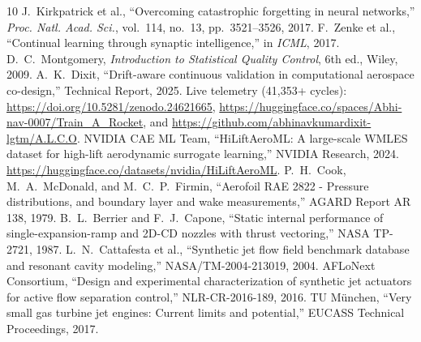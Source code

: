 \documentclass[journal,10pt,twocolumn]{IEEEtran}
\begin{document}
\begin{thebibliography}{10}
 J.~Kirkpatrick et al., ``Overcoming catastrophic forgetting in neural networks,'' \emph{Proc. Natl. Acad. Sci.}, vol.~114, no.~13, pp.~3521--3526, 2017.
 F.~Zenke et al., ``Continual learning through synaptic intelligence,'' in \emph{ICML}, 2017.
 D.~C.~Montgomery, \emph{Introduction to Statistical Quality Control}, 6th ed., Wiley, 2009.
 A.~K.~Dixit, ``Drift-aware continuous validation in computational aerospace co-design,'' Technical Report, 2025. Live telemetry (41,353+ cycles): \url{https://doi.org/10.5281/zenodo.24621665}, \url{https://huggingface.co/spaces/Abhi-nav-0007/Train_A_Rocket}, and \url{https://github.com/abhinavkumardixit-lgtm/A.L.C.O}.
 NVIDIA CAE ML Team, ``HiLiftAeroML: A large-scale WMLES dataset for high-lift aerodynamic surrogate learning,'' NVIDIA Research, 2024. \url{https://huggingface.co/datasets/nvidia/HiLiftAeroML}.
 P.~H.~Cook, M.~A.~McDonald, and M.~C.~P.~Firmin, ``Aerofoil RAE 2822 - Pressure distributions, and boundary layer and wake measurements,'' AGARD Report AR 138, 1979.
 B.~L.~Berrier and F.~J.~Capone, ``Static internal performance of single-expansion-ramp and 2D-CD nozzles with thrust vectoring,'' NASA TP-2721, 1987.
 L.~N.~Cattafesta et al., ``Synthetic jet flow field benchmark database and resonant cavity modeling,'' NASA/TM-2004-213019, 2004.
 AFLoNext Consortium, ``Design and experimental characterization of synthetic jet actuators for active flow separation control,'' NLR-CR-2016-189, 2016.
 TU M\"unchen, ``Very small gas turbine jet engines: Current limits and potential,'' EUCASS Technical Proceedings, 2017.
\end{thebibliography}
\end{document}
